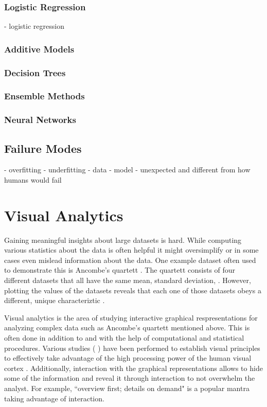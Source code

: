 \subsubsection{Logistic Regression}
- logistic regression

\subsubsection{Additive Models}

\subsubsection{Decision Trees}

\subsubsection{Ensemble Methods}

\subsubsection{Neural Networks}

\subsection{Failure Modes}
- overfitting
- underfitting
- data
- model
- unexpected and different from how humans would fail

\section{Visual Analytics}
Gaining meaningful insights about large datasets is hard.
While computing various statistics about the data is often helpful it might oversimplify or in some cases even mislead information about the data.
One example dataset often used to demonstrate this is Ancombe's quartett .
The quartett consists of four different datasets that all have the same mean, standard deviation, .
However, plotting the values of the datasets reveals that each one of those datasets obeys a different, unique characteriztic .

Visual analytics is the area of studying interactive graphical respresentations for analyzing complex data such as Ancombe's quartett mentioned above.
This is often done in addition to and with the help of computational and statistical procedures.
Various studies (
) have been performed to establish visual principles to effectively take advantage of the high processing power of the human visual cortex .
Additionally, interaction with the graphical representations allows to hide some of the information and reveal it through interaction to not overwhelm the analyst.
For example, ``overview first; details on demand"  is a popular mantra taking advantage of interaction.


